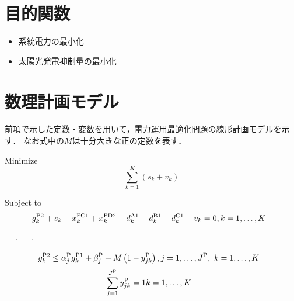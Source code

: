 \documentclass{jarticle}
\newcommand{\IS}{$*$}
\begin{document}
\section{目的関数}

\begin{itemize}
 \item[\IS] 系統電力の最小化
 \item[\IS] 太陽光発電抑制量の最小化
\end{itemize}

\clearpage
\section{数理計画モデル}

前項で示した定数・変数を用いて，電力運用最適化問題の線形計画モデルを示す．
%
なお式中の$M$は十分大きな正の定数を表す．

\noindent
{\rm Minimize}
\begin{equation}
 \sum_{k=1}^{K} \left( s_{k} + v_{k} \right)
\end{equation}

\noindent
{\rm Subject to}
%
\begin{equation}
 g^{\rm P2}_{k} + s_{k}
 - x^{\rm FC1}_{k} + x^{\rm FD2}_{k} 
 - d^{\rm A1}_{k} - d^{\rm B1}_{k} - d^{\rm C1}_{k} - v_k = 0,
 \hfill
 k=1,\ldots,K
~~
\end{equation}
%
\begin{center} --- $ \cdot $ --- $ \cdot $ --- \end{center}
%
\begin{equation}
 g^{\rm P2}_{k} \le \alpha^{\rm P}_j g^{\rm P1}_{k} + \beta^{\rm P}_j + M\left(1-y^{\rm P}_{jk}\right),
 \hfill
 j=1,\ldots,J^{\rm P}, ~
 k=1,\ldots,K
 ~~
 \label{eq:BigM_P}
\end{equation}
%
\begin{equation}
 \sum_{j=1}^{J^{\rm P}} y^{\rm P}_{jk} = 1
 \hfill
 k=1,\ldots,K
 ~~
\end{equation}
\end{document}
